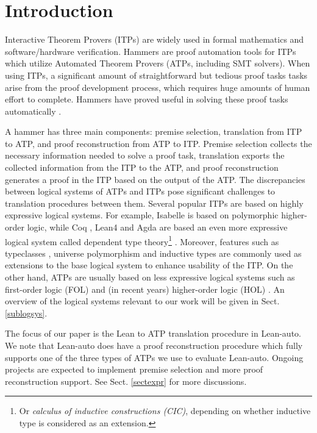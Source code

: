 \section{Introduction}

  Interactive Theorem Provers (ITPs) \cite{Harrison2014HistoryOI}
  are widely used in formal mathematics and software/hardware verification. Hammers
  \cite{Blanchette2016HammeringTQ,Czajka2018HammerFC} are proof automation tools for
  ITPs which utilize Automated Theorem Provers (ATPs, including SMT solvers).
  When using ITPs, a significant amount of straightforward but tedious proof tasks
  tasks arise from the proof development process, which requires huge amounts of human
  effort to complete. Hammers have proved useful in solving these proof tasks automatically \cite{Paulson2012ThreeYO}.
  
  A hammer has three main components: premise selection, translation from ITP to
  ATP, and proof reconstruction from ATP to ITP. Premise selection collects
  the necessary information needed to solve a proof task, translation exports
  the collected information from the ITP to the ATP, and proof reconstruction generates
  a proof in the ITP based on the output of the ATP. The discrepancies between logical systems of ATPs and ITPs pose
  significant challenges to translation procedures between them.
  Several popular ITPs are based on highly expressive logical systems.
  For example, Isabelle \cite{Isabelle} is based on polymorphic higher-order logic, while
  Coq \cite{CoqRefMan}, Lean4 \cite{Lean4} and Agda \cite{Agda}
  are based an even more expressive logical system called dependent type
  theory\footnote{Or \textit{calculus of inductive constructions (CIC)}, depending
  on whether inductive type is considered as an extension.}
  \cite{LambdaWithType,Coquand1988}.
  Moreover, features such as typeclasses \cite{TypeClassHaskell}, universe polymorphism \cite{UPolyCoq} and inductive types \cite{CICIndDef}
  are commonly used as extensions to the base logical system to enhance usability of the ITP.
  On the other hand, ATPs are usually based on less expressive logical systems such
  as first-order logic (FOL) \cite{CVC5,Vampire,Z3Paper,EProver} and (in recent years)
  higher-order logic (HOL) \cite{HOVampire,ZipperpositionMakeWork,HOEProver}.
  An overview of the logical systems relevant to our work will be given in Sect. \ref{sublogsys}.

  The focus of our paper is the Lean to ATP translation procedure in Lean-auto.
  We note that Lean-auto does have a proof reconstruction procedure which fully supports
  one of the three types of ATPs we use to evaluate Lean-auto.
  Ongoing projects are expected to implement premise selection and more proof reconstruction support.
  See Sect. \ref{sectexpr} for more discussions.

